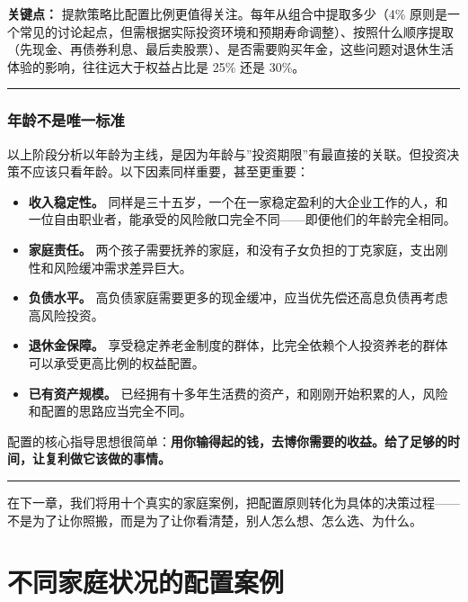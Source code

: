 \documentclass[a4paper,11pt,oneside,fontset=none,UTF8,zihao=-4]{ctexbook}
\providecommand{\tightlist}{\setlength{\itemsep}{2pt}\setlength{\parskip}{1pt}}
\begin{document}
\textbf{关键点：}
提款策略比配置比例更值得关注。每年从组合中提取多少（4\%
原则是一个常见的讨论起点，但需根据实际投资环境和预期寿命调整）、按照什么顺序提取（先现金、再债券利息、最后卖股票）、是否需要购买年金，这些问题对退休生活体验的影响，往往远大于权益占比是
25\% 还是 30\%。

\begin{center}{\color{dh-bronze}\rule{0.2\textwidth}{0.5pt}}\end{center}

\subsection{年龄不是唯一标准}\label{ux5e74ux9f84ux4e0dux662fux552fux4e00ux6807ux51c6}

以上阶段分析以年龄为主线，是因为年龄与''投资期限''有最直接的关联。但投资决策不应该只看年龄。以下因素同样重要，甚至更重要：

\begin{itemize}
\tightlist
\item
  \textbf{收入稳定性。}
  同样是三十五岁，一个在一家稳定盈利的大企业工作的人，和一位自由职业者，能承受的风险敞口完全不同------即便他们的年龄完全相同。
\item
  \textbf{家庭责任。}
  两个孩子需要抚养的家庭，和没有子女负担的丁克家庭，支出刚性和风险缓冲需求差异巨大。
\item
  \textbf{负债水平。}
  高负债家庭需要更多的现金缓冲，应当优先偿还高息负债再考虑高风险投资。
\item
  \textbf{退休金保障。}
  享受稳定养老金制度的群体，比完全依赖个人投资养老的群体可以承受更高比例的权益配置。
\item
  \textbf{已有资产规模。}
  已经拥有十多年生活费的资产，和刚刚开始积累的人，风险和配置的思路应当完全不同。
\end{itemize}

配置的核心指导思想很简单：\textbf{用你输得起的钱，去博你需要的收益。给了足够的时间，让复利做它该做的事情。}

\begin{center}{\color{dh-bronze}\rule{0.2\textwidth}{0.5pt}}\end{center}

在下一章，我们将用十个真实的家庭案例，把配置原则转化为具体的决策过程------不是为了让你照搬，而是为了让你看清楚，别人怎么想、怎么选、为什么。

\newpage

\chapter{不同家庭状况的配置案例}\label{ux4e0dux540cux5bb6ux5eadux72b6ux51b5ux7684ux914dux7f6eux6848ux4f8b}
\end{document}
